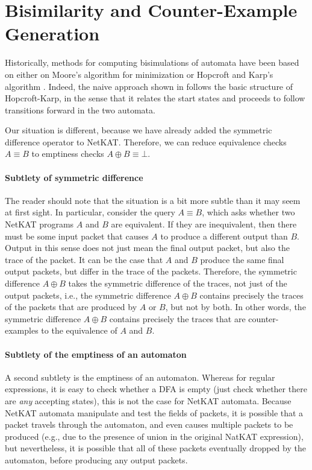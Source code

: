 \documentclass[acmsmall,dvipsnames,nonacm]{acmart}
\begin{document}
\section{Bisimilarity and Counter-Example Generation}\label{sec:fwdbwd}

Historically, methods for computing bisimulations of automata
\cite{Bonchi2013,Doenges2022} have been based on either on Moore's
algorithm for minimization \cite{Moore1956} or Hopcroft and Karp's
algorithm \cite{Hopcroft1971}. Indeed, the naive approach shown
in  follows the basic structure of Hopcroft-Karp, in
the sense that it relates the start states and proceeds to follow
transitions forward in the two automata.

Our situation is different, because we have already added the
symmetric difference operator to NetKAT.  Therefore, we can reduce
equivalence checks $A \equiv B$ to emptiness checks $A \oplus B \equiv
\bot$.

\paragraph{Subtlety of symmetric difference}
%
The reader should note that the situation is a bit more subtle than it
may seem at first sight.  In particular, consider the query $A \equiv
B$, which asks whether two NetKAT programs $A$ and $B$ are equivalent.
If they are inequivalent, then there must be some input packet that
causes $A$ to produce a different output than $B$.  Output in this
sense does not just mean the final output packet, but also the trace
of the packet.  It can be the case that $A$ and $B$ produce the same
final output packets, but differ in the trace of the packets.
Therefore, the symmetric difference $A \oplus B$ takes the symmetric
difference of the traces, not just of the output packets, i.e., the
symmetric difference $A \oplus B$ contains precisely the traces of the
packets that are produced by $A$ or $B$, but not by both.  In other
words, the symmetric difference $A \oplus B$ contains precisely the
traces that are counter-examples to the equivalence of $A$ and $B$.

\paragraph{Subtlety of the emptiness of an automaton}
%
A second subtlety is the emptiness of an automaton.  Whereas for
regular expressions, it is easy to check whether a DFA is empty (just
check whether there are \emph{any} accepting states), this is not the
case for NetKAT automata.  Because NetKAT automata manipulate and test
the fields of packets, it is possible that a packet travels through
the automaton, and even causes multiple packets to be produced (e.g.,
due to the presence of union in the original NatKAT expression), but
nevertheless, it is possible that all of these packets eventually
dropped by the automaton, before producing any output packets.
\end{document}
